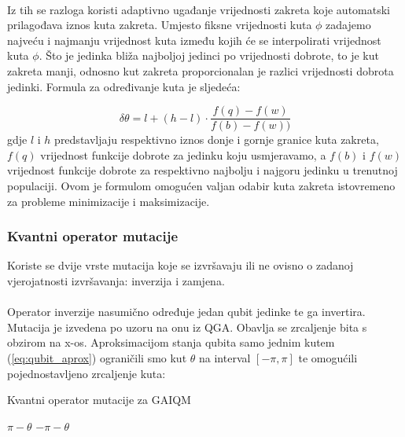 \documentclass[times, utf8, zavrsni, numeric]{fer}
\begin{document}
\paragraph{}
Iz tih se razloga koristi adaptivno ugađanje vrijednosti zakreta koje automatski prilagođava iznos kuta zakreta.\citep{adaptive_qga} Umjesto fiksne vrijednosti kuta $\phi$ zadajemo najveću i najmanju vrijednost kuta između kojih će se interpolirati vrijednost kuta $\phi$. Što je jedinka bliža najboljoj jedinci po vrijednosti dobrote, to je kut zakreta manji, odnosno kut zakreta proporcionalan je razlici vrijednosti dobrota jedinki. Formula za određivanje kuta je sljedeća:

\begin{equation}
\label{eq:adapt}
\delta\theta = l + (h - l) \cdot \frac{f(q) - f(w)}{f(b) - f(w))}
\end{equation}
gdje $l$ i $h$ predstavljaju respektivno iznos donje i gornje granice kuta zakreta, $f(q)$ vrijednost funkcije dobrote za jedinku koju usmjeravamo, a $f(b)$ i $f(w)$ vrijednost funkcije dobrote za respektivno najbolju i najgoru jedinku u trenutnoj populaciji. Ovom je formulom omogućen valjan odabir kuta zakreta istovremeno za probleme minimizacije i maksimizacije.

\subsubsection{Kvantni operator mutacije}
Koriste se dvije vrste mutacija koje se izvršavaju ili ne ovisno o zadanoj vjerojatnosti izvršavanja: inverzija i zamjena.

\paragraph{}
Operator inverzije nasumično određuje jedan qubit jedinke te ga invertira. Mutacija je izvedena po uzoru na onu iz QGA. Obavlja se zrcaljenje bita s obzirom na x-os. Aproksimacijom stanja qubita samo jednim kutem (\ref{eq:qubit_aprox}) ograničili smo kut $\theta$ na interval $[-\pi, \pi]$ te omogućili pojednostavljeno zrcaljenje kuta:
\begin{algorithm}
\caption{Kvantni operator mutacije za GAIQM}
\label{algo:gaiqm_mut}
\begin{algorithmic}
\RETURN $\pi - \theta$
\ELSE
\RETURN $-\pi - \theta$
\ENDIF
\end{algorithmic}
\end{algorithm}
\end{document}
